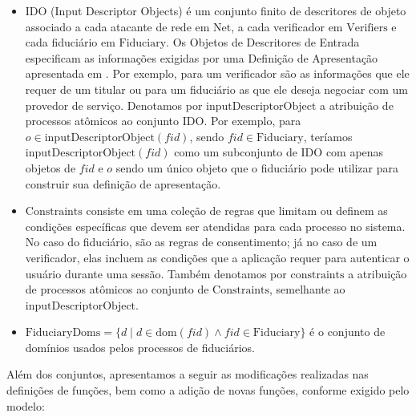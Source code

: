 \begin{itemize}
  \item $\text{IDO}$ (Input Descriptor Objects) é um conjunto finito de descritores de objeto associado a cada atacante de rede em $\text{Net}$, a cada verificador em $\text{Verifiers}$ e cada fiduciário em $\text{Fiduciary}$. 
  Os Objetos de Descritores de Entrada especificam as informações exigidas  por uma Definição de Apresentação apresentada em \cite{presentation-exchange}. Por exemplo, para um verificador são as informações que ele requer de um titular ou para um fiduciário as que ele deseja negociar com um provedor de serviço. 
  Denotamos por $\text{inputDescriptorObject}$ a atribuição de processos atômicos ao conjunto $\text{IDO}$. Por exemplo, para $o \in \text{inputDescriptorObject}(fid)$, sendo $fid \in \text{Fiduciary}$, teríamos $\text{inputDescriptorObject}(fid)$ como um subconjunto de $\text{IDO}$ com apenas objetos de $fid$ e $o$ sendo um único objeto que o fiduciário pode utilizar para construir sua definição de apresentação.
  \item $\text{Constraints}$ consiste em uma coleção de regras que limitam ou definem as condições específicas que devem ser atendidas para cada processo no sistema. No caso do fiduciário, são as regras de consentimento; já no caso de um verificador, elas incluem as condições que a aplicação requer para autenticar o usuário durante uma sessão. 
  Também denotamos por $\text{constraints}$ a atribuição de processos atômicos ao conjunto de $\text{Constraints}$,  semelhante ao $\text{inputDescriptorObject}$.
  \item $ \text{FiduciaryDoms} = \{ d \; | \; d \in \text{dom}(fid) \wedge fid \in \text{Fiduciary} \}$ é o conjunto de domínios usados pelos processos de fiduciários.
\end{itemize}

Além dos conjuntos, apresentamos a seguir as modificações realizadas nas definições de funções, bem como a adição de novas funções, conforme exigido pelo modelo:

